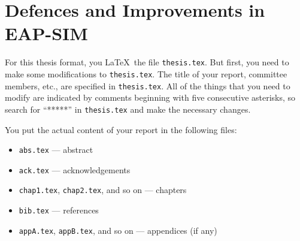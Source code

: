 \chapter{Defences and Improvements in EAP-SIM}

For this thesis
format, you \LaTeX\ the file {\tt thesis.tex}. 
But first, you
need to make some modifications to {\tt thesis.tex}.
The title of your report, committee members, etc.,
are specified in {\tt thesis.tex}. All of the things that
you need to modify are indicated by comments beginning with five consecutive asterisks, 
so search for ``*****'' in {\tt thesis.tex} and make the necessary changes.

You put the actual content of your report 
in the following files:
\begin{itemize}
\item {\tt abs.tex} --- abstract
\item {\tt ack.tex} --- acknowledgements
\item {\tt chap1.tex}, {\tt chap2.tex}, and so on --- chapters
\item {\tt bib.tex} --- references
\item {\tt appA.tex}, {\tt appB.tex}, and so on --- appendices (if any)
\end{itemize}
